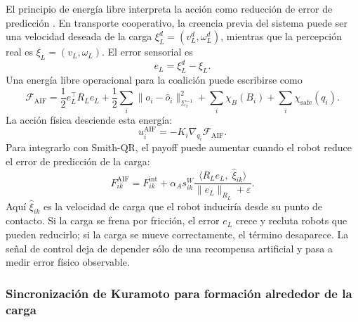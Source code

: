 El principio de energía libre interpreta la acción como reducción de error de predicción
\citep{friston2010free}. En transporte cooperativo, la creencia previa del sistema puede
ser una velocidad deseada de la carga $\xi_L^d=(v_L^d,\omega_L^d)$, mientras que la
percepción real es $\xi_L=(v_L,\omega_L)$. El error sensorial es
\[
  e_L=\xi_L^d-\xi_L .
\]
Una energía libre operacional para la coalición puede escribirse como
\begin{equation}
  \mathcal F_{\mathrm{AIF}}
  =
  \frac12 e_L^\top R_L e_L
  +
  \frac12\sum_i
  \|o_i-\widehat o_i\|_{\Sigma_i^{-1}}^2
  +
  \sum_i\chi_B(B_i)
  +
  \sum_i\chi_{\mathrm{safe}}(q_i).
  \label{eq:free_energy_AMR}
\end{equation}
La acción física desciende esta energía:
\begin{equation}
  u_i^{\mathrm{AIF}}
  =
  -K_i\nabla_{q_i}\mathcal F_{\mathrm{AIF}} .
  \label{eq:control_inferencia_activa}
\end{equation}
Para integrarlo con Smith-QR, el payoff puede aumentar cuando el robot reduce el error
de predicción de la carga:
\begin{equation}
  F_{ik}^{\mathrm{AIF}}
  =
  F_{ik}^{\mathrm{int}}
  +
  \alpha_A
  s_{ik}^{W}
  \frac{\langle R_L e_L,\;\widehat \xi_{ik}\rangle}
       {\|e_L\|_{R_L}+\varepsilon}.
  \label{eq:payoff_inferencia_activa}
\end{equation}
Aquí $\widehat \xi_{ik}$ es la velocidad de carga que el robot induciría desde su punto
de contacto. Si la carga se frena por fricción, el error $e_L$ crece y recluta robots
que pueden reducirlo; si la carga se mueve correctamente, el término desaparece. La
señal de control deja de depender sólo de una recompensa artificial y pasa a medir error
físico observable.

\subsubsection{Sincronización de Kuramoto para formación alrededor de la carga}

